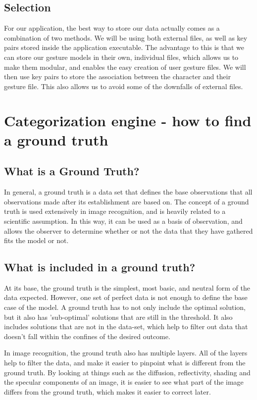 \documentclass[onecolumn, draftclsnofoot,10pt, journal, letterpaper]{IEEEtran}
\begin{document}
    \subsection{Selection}
        For our application, the best way to store our data actually comes as a combination of two methods. We will be using both external files, as well as key pairs stored inside the application executable. The advantage to this is that we can store our gesture models in their own, individual files, which allows us to make them modular, and enables the easy creation of user gesture files. We will then use key pairs to store the association between the character and their gesture file. This also allows us to avoid some of the downfalls of external files.

\section{Categorization engine - how to find a ground truth}
    \subsection{What is a Ground Truth?}
        In general, a ground truth is a data set that defines the base observations that all observations made after its establishment are based on. The concept of a ground truth is used extensively in image recognition, and is heavily related to a scientific assumption. In this way, it can be used as a basis of observation, and allows the observer to determine whether or not the data that they have gathered fits the model or not. \cite{danilo_pena_ground_2018}
    
    \subsection{What is included in a ground truth?}
        At its base, the ground truth is the simplest, most basic, and neutral form of the data expected. However, one set of perfect data is not enough to define the base case of the model. A ground truth has to not only include the optimal solution, but it also has 'sub-optimal' solutions that are still in the threshold. \cite{krig_computer_2014} It also includes solutions that are not in the data-set, which help to filter out data that doesn't fall within the confines of the desired outcome.\par
        In image recognition, the ground truth also has multiple layers. All of the layers help to filter the data, and make it easier to pinpoint what is different from the ground truth. By looking at things such as the diffusion, reflectivity, shading and the specular components of an image, it is easier to see what part of the image differs from the ground truth, which makes it easier to correct later. \cite{roger_grose_ground_2009}
    
\end{document}

